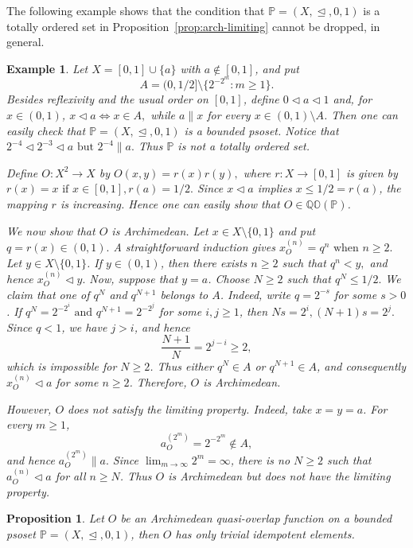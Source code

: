 \documentclass[preprint,12pt]{elsarticle}
\newtheorem{proposition}[theorem]{Proposition}
\newtheorem{example}[theorem]{Example}
\begin{document}
The following example shows that the condition that $\mathbb{P}=(X,\trianglelefteq,0,1)$ is a totally ordered set in Proposition~\ref{prop:arch-limiting} cannot be dropped, in general.
\begin{example}\label{ex:arch-not-limiting}
\upshape
Let $X=[0,1]\cup\{a\}$ with $a\notin[0,1]$, and put
$$
A=(0,1/2]\setminus\{2^{-2^m}:m\ge1\}.
$$
Besides reflexivity and the usual order on $[0,1]$, define
$
0\triangleleft a\triangleleft1
$
and, for $x\in(0,1)$,
$
x\triangleleft a\Longleftrightarrow x\in A,
$
while $a\parallel x$ for every $x\in(0,1)\setminus A$. Then one can easily check that
$\mathbb{P}=(X,\trianglelefteq,0,1)$ is a bounded psoset. Notice that
$
2^{-4}\triangleleft2^{-3}\triangleleft a
\mbox{ but }
2^{-4}\parallel a.
$
Thus $\mathbb{P}$ is not a totally ordered set.

Define $O:X^2\to X$ by
$
O(x,y)=r(x)r(y),
$
where $r:X\to[0,1]$ is given by
$
r(x)=x\mbox{ if }x\in[0,1],
r(a)=1/2.
$
Since $x\triangleleft a$ implies $x\le1/2=r(a)$, the mapping $r$ is increasing. Hence one can easily show that
$O\in\mathbb{QO}(\mathbb{P})$.

We now show that $O$ is Archimedean. Let
$x\in X\setminus\{0,1\}$ and put
$
q=r(x)\in(0,1).
$
A straightforward induction gives
$
x_O^{(n)}=q^n\mbox{ when }n\ge2.
$
Let $y\in X\setminus\{0,1\}$. If $y\in(0,1)$, then there exists
$n\ge2$ such that
$
q^n<y,
$
and hence
$
x_O^{(n)}\triangleleft y.
$
Now, suppose that $y=a$. Choose $N\ge2$ such that
$
q^N\le1/2.
$
We claim that one of $q^N$ and $q^{N+1}$ belongs to $A$. Indeed, write
$q=2^{-s}$ for some $s>0$. If
$
q^N=2^{-2^i}
\mbox{ and }
q^{N+1}=2^{-2^j}
$
for some $i,j\ge1$, then
$
Ns=2^i, (N+1)s=2^j.
$
Since $q<1$, we have $j>i$, and hence
$$
\frac{N+1}{N}=2^{j-i}\ge2,
$$
which is impossible for $N\ge2$. Thus either
$q^N\in A$ or $q^{N+1}\in A$, and consequently
$
x_O^{(n)}\triangleleft a
$
for some $n\ge2$. Therefore, $O$ is Archimedean.

However, $O$ does not satisfy the limiting property. Indeed, take
$x=y=a$. For every $m\ge1$,
$$
a_O^{(2^m)}=2^{-2^m}\notin A,
$$
and hence
$
a_O^{(2^m)}\parallel a.
$
Since $\lim_{m\to\infty}2^m=\infty$, there is no $N\ge2$ such that
$
a_O^{(n)}\triangleleft a
$
for all $n\ge N$. Thus $O$ is Archimedean but does not have the limiting property.
\end{example}


\begin{proposition}\label{prop:arch-idempotent}
Let $O$ be an Archimedean quasi-overlap function on a bounded psoset $\mathbb{P}=(X,\trianglelefteq,0,1)$, then $O$ has only trivial idempotent elements.
\end{proposition}
\end{document}

